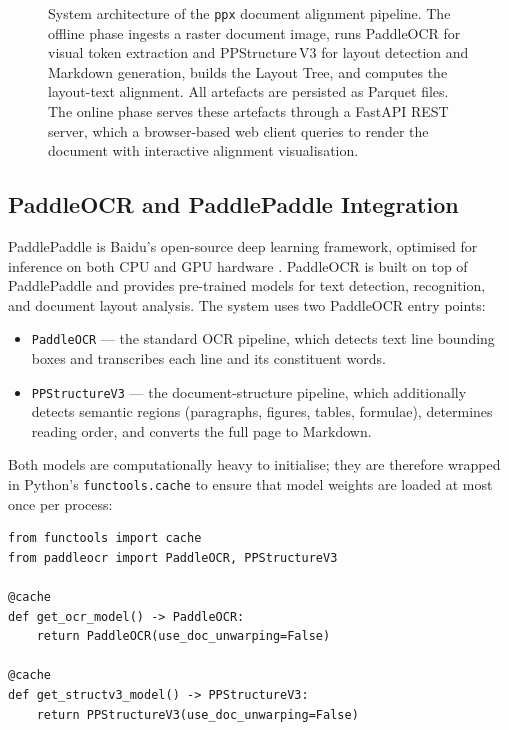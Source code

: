 \documentclass{article}
\theoremstyle{definition}
\begin{document}
\begin{figure}[h]
\begin{tikzpicture}
  \end{tikzpicture}
  \caption{System architecture of the \texttt{ppx} document alignment pipeline.
    The offline phase ingests a raster document image, runs PaddleOCR for
    visual token extraction and PPStructure\,V3 for layout detection and
    Markdown generation, builds the Layout Tree, and computes the
    layout-text alignment.  All artefacts are persisted as Parquet files.
    The online phase serves these artefacts through a FastAPI REST server,
    which a browser-based web client queries to render the document with
    interactive alignment visualisation.}
  \label{fig:system-arch}
\end{figure}

\subsection{PaddleOCR and PaddlePaddle Integration}
\label{sec:paddle}

PaddlePaddle is Baidu's open-source deep learning framework, optimised for
inference on both CPU and GPU hardware \cite{PaddleOCR30}.  PaddleOCR is
built on top of PaddlePaddle and provides pre-trained models for text
detection, recognition, and document layout analysis.  The system uses two
PaddleOCR entry points:
\begin{itemize}
  \item \texttt{PaddleOCR} --- the standard OCR pipeline, which detects text
        line bounding boxes and transcribes each line and its constituent
        words.
  \item \texttt{PPStructureV3} --- the document-structure pipeline, which
        additionally detects semantic regions (paragraphs, figures, tables,
        formulae), determines reading order, and converts the full page to
        Markdown.
\end{itemize}

Both models are computationally heavy to initialise; they are therefore
wrapped in Python's \texttt{functools.cache} to ensure that model weights are
loaded at most once per process:

\begin{lstlisting}
from functools import cache
from paddleocr import PaddleOCR, PPStructureV3

@cache
def get_ocr_model() -> PaddleOCR:
    return PaddleOCR(use_doc_unwarping=False)

@cache
def get_structv3_model() -> PPStructureV3:
    return PPStructureV3(use_doc_unwarping=False)
\end{lstlisting}
\end{document}
